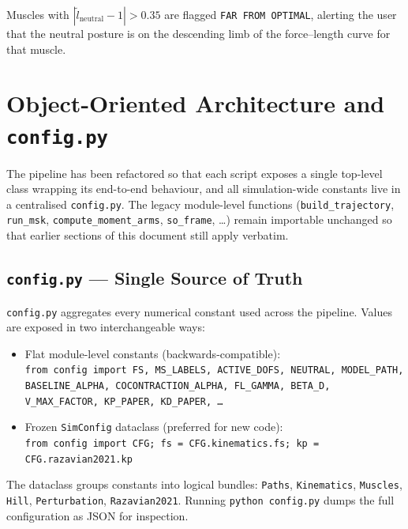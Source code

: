 \documentclass[11pt,a4paper]{article}
\begin{document}
Muscles with $|\tilde{l}_\text{neutral} - 1| > 0.35$ are flagged
\texttt{FAR FROM OPTIMAL}, alerting the user that the neutral posture
is on the descending limb of the force--length curve for that muscle.


\section{Object-Oriented Architecture and \texttt{config.py}}
\label{sec:oo-config}

The pipeline has been refactored so that each script exposes a single
top-level class wrapping its end-to-end behaviour, and all
simulation-wide constants live in a centralised \texttt{config.py}.
The legacy module-level functions (\texttt{build\_trajectory}, \texttt{run\_msk},
\texttt{compute\_moment\_arms}, \texttt{so\_frame}, \dots) remain importable
unchanged so that earlier sections of this document still apply verbatim.

\subsection{\texttt{config.py} — Single Source of Truth}

\texttt{config.py} aggregates every numerical constant used across the
pipeline.  Values are exposed in two interchangeable ways:

\begin{itemize}
  \item Flat module-level constants (backwards-compatible):\\
        \texttt{from config import FS, MS\_LABELS, ACTIVE\_DOFS, NEUTRAL,
        MODEL\_PATH, BASELINE\_ALPHA, COCONTRACTION\_ALPHA, FL\_GAMMA,
        BETA\_D, V\_MAX\_FACTOR, KP\_PAPER, KD\_PAPER, \dots}
  \item Frozen \texttt{SimConfig} dataclass (preferred for new code):\\
        \texttt{from config import CFG;  fs = CFG.kinematics.fs;
        kp = CFG.razavian2021.kp}
\end{itemize}

The dataclass groups constants into logical bundles:
\texttt{Paths}, \texttt{Kinematics}, \texttt{Muscles}, \texttt{Hill},
\texttt{Perturbation}, \texttt{Razavian2021}.  Running \texttt{python
config.py} dumps the full configuration as JSON for inspection.
\end{document}
